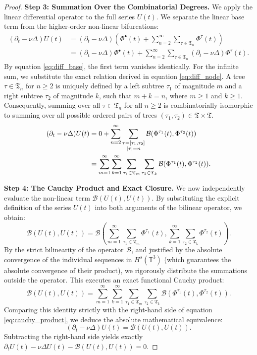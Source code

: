 \documentclass[12pt,a4paper]{article}
\theoremstyle{plain}
\theoremstyle{definition}
\theoremstyle{remark}
\newcommand{\Hs}{H^s}
\newcommand{\T}{\mathbb{T}}
\newcommand{\BB}{\mathcal{B}}
\newcommand{\fT}{\mathfrak{T}}
\begin{document}
\begin{proof}
\textbf{Step 3: Summation Over the Combinatorial Degrees.}
We apply the linear differential operator to the full series $U(t)$. We separate the linear base term from the higher-order non-linear bifurcations:
\begin{align*}
  (\partial_t - \nu \Delta) U(t) 
  &= (\partial_t - \nu \Delta) \left( \Phi^\bullet(t) + \sum_{n=2}^\infty \sum_{\tau \in \fT_n} \Phi^\tau(t) \right) \\
  &= (\partial_t - \nu \Delta) \Phi^\bullet(t) + \sum_{n=2}^\infty \sum_{\tau \in \fT_n} (\partial_t - \nu \Delta) \Phi^\tau(t).
\end{align*}
By equation \eqref{eq:diff_base}, the first term vanishes identically. For the infinite sum, we substitute the exact relation derived in equation \eqref{eq:diff_node}. A tree $\tau \in \fT_n$ for $n \ge 2$ is uniquely defined by a left subtree $\tau_1$ of magnitude $m$ and a right subtree $\tau_2$ of magnitude $k$, such that $m + k = n$, where $m \ge 1$ and $k \ge 1$. Consequently, summing over all $\tau \in \fT_n$ for all $n \ge 2$ is combinatorially isomorphic to summing over all possible ordered pairs of trees $(\tau_1, \tau_2) \in \fT \times \fT$.
\begin{align}
  (\partial_t - \nu \Delta) U(t) 
  &= 0 + \sum_{n=2}^\infty \sum_{\substack{\tau = [\tau_1, \tau_2] \\ |\tau| = n}} \BB(\Phi^{\tau_1}(t), \Phi^{\tau_2}(t)) \notag \\
  &= \sum_{m=1}^\infty \sum_{k=1}^\infty \sum_{\tau_1 \in \fT_m} \sum_{\tau_2 \in \fT_k} \BB(\Phi^{\tau_1}(t), \Phi^{\tau_2}(t)). \label{eq:cauchy_product}
\end{align}

\textbf{Step 4: The Cauchy Product and Exact Closure.}
We now independently evaluate the non-linear term $\BB(U(t), U(t))$. By substituting the explicit definition of the series $U(t)$ into both arguments of the bilinear operator, we obtain:
\[
  \BB(U(t), U(t)) = \BB\left( \sum_{m=1}^\infty \sum_{\tau_1 \in \fT_m} \Phi^{\tau_1}(t), \sum_{k=1}^\infty \sum_{\tau_2 \in \fT_k} \Phi^{\tau_2}(t) \right).
\]
By the strict bilinearity of the operator $\BB$, and justified by the absolute convergence of the individual sequences in $\Hs(\T^3)$ (which guarantees the absolute convergence of their product), we rigorously distribute the summations outside the operator. This executes an exact functional Cauchy product:
\[
  \BB(U(t), U(t)) = \sum_{m=1}^\infty \sum_{k=1}^\infty \sum_{\tau_1 \in \fT_m} \sum_{\tau_2 \in \fT_k} \BB(\Phi^{\tau_1}(t), \Phi^{\tau_2}(t)).
\]
Comparing this identity strictly with the right-hand side of equation \eqref{eq:cauchy_product}, we deduce the absolute mathematical equivalence:
\[
  (\partial_t - \nu \Delta) U(t) = \BB(U(t), U(t)).
\]
Subtracting the right-hand side yields exactly $\partial_t U(t) - \nu \Delta U(t) - \BB(U(t), U(t)) = 0$.


\end{proof}
\end{document}
